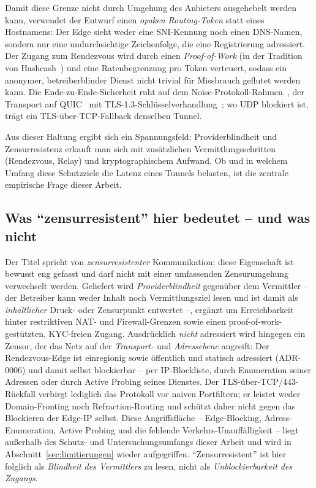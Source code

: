 Damit diese Grenze nicht durch Umgehung des Anbieters ausgehebelt werden kann,
verwendet der Entwurf einen \emph{opaken Routing-Token} statt eines Hostnamens:
Der Edge sieht weder eine SNI-Kennung noch einen DNS-Namen, sondern nur eine
undurchsichtige Zeichenfolge, die eine Registrierung adressiert. Der Zugang zum
Rendezvous wird durch einen \emph{Proof-of-Work} (in der Tradition von
Hashcash~\cite{back2002hashcash}) und eine Ratenbegrenzung pro Token
verteuert, sodass ein anonymer, betreiberblinder Dienst nicht trivial für
Missbrauch geflutet werden kann. Die Ende-zu-Ende-Sicherheit ruht auf dem
Noise-Protokoll-Rahmen~\cite{noiseprotocol}, der Transport auf
QUIC~\cite{rfc9000} mit TLS-1.3-Schlüsselverhandlung~\cite{rfc9001}; wo UDP
blockiert ist, trägt ein TLS-über-TCP-Fallback denselben Tunnel.

Aus dieser Haltung ergibt sich ein Spannungsfeld: Providerblindheit und
Zensurresistenz erkauft man sich mit zusätzlichen Vermittlungsschritten
(Rendezvous, Relay) und kryptographischem Aufwand. Ob und in welchem Umfang
diese Schutzziele die Latenz eines Tunnels belasten, ist die zentrale empirische
Frage dieser Arbeit.

\subsection{Was ``zensurresistent'' hier bedeutet -- und was nicht}
\label{sec:zensur-scope}

Der Titel spricht von \emph{zensurresistenter} Kommunikation; diese Eigenschaft ist
bewusst eng gefasst und darf nicht mit einer umfassenden Zensurumgehung verwechselt
werden. Geliefert wird \emph{Providerblindheit} gegenüber dem Vermittler -- der
Betreiber kann weder Inhalt noch Vermittlungsziel lesen und ist damit als
\emph{inhaltlicher} Druck- oder Zensurpunkt entwertet --, ergänzt um Erreichbarkeit
hinter restriktiven NAT- und Firewall-Grenzen sowie einen proof-of-work-gestützten,
KYC-freien Zugang. Ausdrücklich \emph{nicht} adressiert wird hingegen ein Zensor, der
das Netz auf der \emph{Transport-} und \emph{Adressebene} angreift: Der
Rendezvous-Edge ist einregionig sowie öffentlich und statisch adressiert (ADR-0006)
und damit selbst blockierbar -- per IP-Blockliste, durch Enumeration seiner Adressen
oder durch Active Probing seines Dienstes. Der TLS-über-TCP/443-Rückfall verbirgt
lediglich das Protokoll vor naiven Portfiltern; er leistet weder Domain-Fronting noch
Refraction-Routing und schützt daher nicht gegen das Blockieren der Edge-IP selbst.
Diese Angriffsfläche -- Edge-Blocking, Adress-Enumeration, Active Probing und die
fehlende Verkehrs-Unauffälligkeit -- liegt außerhalb des Schutz- und
Untersuchungsumfangs dieser Arbeit und wird in Abschnitt~\ref{sec:limitierungen}
wieder aufgegriffen. ``Zensurresistent'' ist hier folglich als \emph{Blindheit des
Vermittlers} zu lesen, nicht als \emph{Unblockierbarkeit des Zugangs}.

